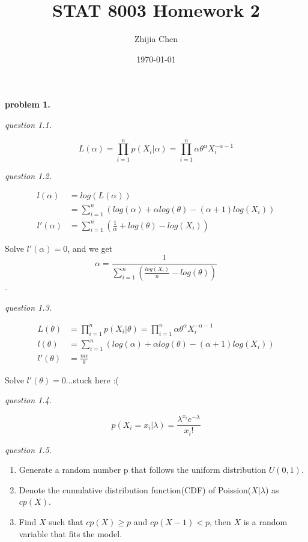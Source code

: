 \documentclass{article}
\title{STAT 8003 Homework 2}
\author{Zhijia Chen}
\date{\today}
\begin{document}
\begin{titlepage}
    \maketitle
\end{titlepage}

\textbf{problem 1.}

\vspace{\baselineskip}
\textit{question 1.1.}

$$L(\alpha)=\prod_{i=1}^np(X_i|\alpha)=\prod_{i=1}^n\alpha\theta^\alpha X_i^{-\alpha-1}$$

\vspace{\baselineskip}
\textit{question 1.2.}

\begin{align*}
    l(\alpha)&=log(L(\alpha))\\
             &=\sum_{i=1}^n \left(log(\alpha)+\alpha log(\theta)-(\alpha+1)log(X_i)\right)\\
    l'(\alpha)&=\sum_{i=1}^n \left(\frac{1}{\alpha}+log(\theta)-log(X_i)\right)
\end{align*}

Solve $l'(\alpha)=0$, and we get $$\alpha=\frac{1}{\sum_{i=1}^n\left(\frac{log(X_i)}{n}-log(\theta)\right)}$$.

\vspace{\baselineskip}
\textit{question 1.3.}

\begin{align*}
    L(\theta)&=\prod_{i=1}^np(X_i|\theta)=\prod_{i=1}^n\alpha\theta^\alpha X_i^{-\alpha-1}\\
    l(\theta)&=\sum_{i=1}^n \left(log(\alpha)+\alpha log(\theta)-(\alpha+1)log(X_i)\right)\\
    l'(\theta)&=\frac{n\alpha}{\theta}
\end{align*}

Solve $l'(\theta)=0$...stuck here :(

\vspace{\baselineskip}
\textit{question 1.4.}

$$p(X_i=x_i|\lambda) = \frac{\lambda^{x_i}e^{-\lambda}}{x_i!}$$

\vspace{\baselineskip}
\textit{question 1.5.}

\begin{enumerate}
    \item Generate a random number p that follows the uniform distribution $U(0, 1)$.
    \item Denote the cumulative distribution function(CDF) of Poission($X|\lambda$) as $cp(X)$.
    \item Find $X$ such that $cp(X)\geq p$ and $cp(X-1)<p$, then $X$ is a random variable that fits the model.
\end{enumerate}
  
\end{document}
